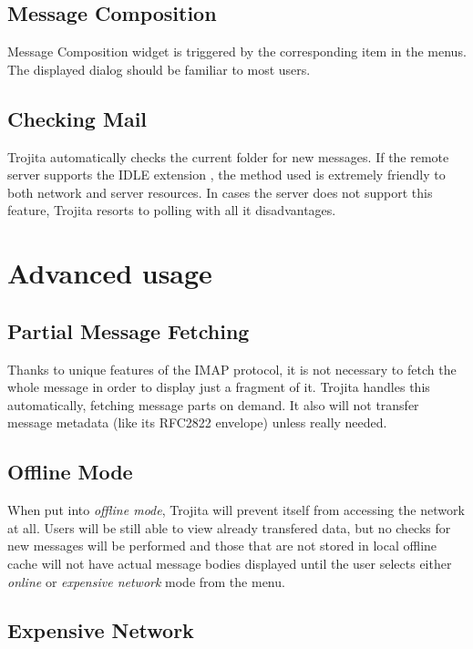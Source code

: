 \documentclass[12pt,notitlepage]{report}
\newcommand{\trojita}{Trojita\xspace}
\begin{document}
\subsection{Message Composition}

Message Composition widget is triggered by the corresponding item in the menus.
The displayed dialog should be familiar to most users.

\subsection{Checking Mail}

\trojita automatically checks the current folder for new messages.  If the
remote server supports the IDLE extension \cite{rfc-idle}, the method used is
extremely friendly to both network and server resources.  In cases the server
does not support this feature, \trojita resorts to polling with all it
disadvantages.

\section{Advanced usage}

\subsection{Partial Message Fetching}

Thanks to unique features of the IMAP protocol, it is not necessary to fetch the
whole message in order to display just a fragment of it.  \trojita handles this
automatically, fetching message parts on demand.  It also will not transfer message
metadata (like its RFC2822 envelope) unless really needed.

\subsection{Offline Mode}

When put into {\em offline mode}, \trojita will prevent itself from accessing
the network at all.  Users will be still able to view already transfered data, but
no checks for new messages will be performed and those that are not stored in
local offline cache will not have actual message bodies displayed until the user
selects either {\em online} or {\em expensive network} mode from the menu.

\subsection{Expensive Network}
\end{document}
